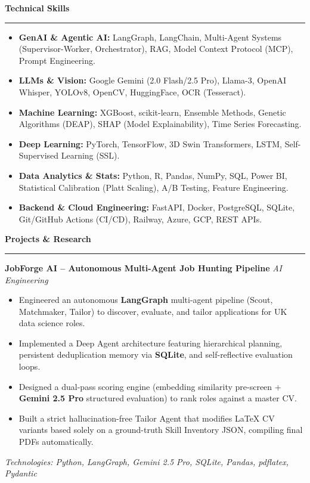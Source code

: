 \documentclass[a4paper,10pt]{article}
\newcommand{\sect}[1]{\vspace{8pt}\noindent\textbf{\color{heading}\large #1}\vspace{3pt}\hrule\vspace{6pt}}
\begin{document}
\sect{Technical Skills}
\begin{itemize}[leftmargin=*, itemsep=0pt, parsep=0pt, topsep=2pt]
    \item \textbf{GenAI \& Agentic AI:} LangGraph, LangChain, Multi-Agent Systems (Supervisor-Worker, Orchestrator), RAG, Model Context Protocol (MCP), Prompt Engineering.
    \item \textbf{LLMs \& Vision:} Google Gemini (2.0 Flash/2.5 Pro), Llama-3, OpenAI Whisper, YOLOv8, OpenCV, HuggingFace, OCR (Tesseract).
    \item \textbf{Machine Learning:} XGBoost, scikit-learn, Ensemble Methods, Genetic Algorithms (DEAP), SHAP (Model Explainability), Time Series Forecasting.
    \item \textbf{Deep Learning:} PyTorch, TensorFlow, 3D Swin Transformers, LSTM, Self-Supervised Learning (SSL).
    \item \textbf{Data Analytics \& Stats:} Python, R, Pandas, NumPy, SQL, Power BI, Statistical Calibration (Platt Scaling), A/B Testing, Feature Engineering.
    \item \textbf{Backend \& Cloud Engineering:} FastAPI, Docker, PostgreSQL, SQLite, Git/GitHub Actions (CI/CD), Railway, Azure, GCP, REST APIs.
\end{itemize}


\sect{Projects \& Research}

\noindent\textbf{JobForge AI – Autonomous Multi-Agent Job Hunting Pipeline} \hfill \textit{AI Engineering}
\begin{itemize}[leftmargin=*, topsep=4pt, itemsep=2pt]
    \item Engineered an autonomous \textbf{LangGraph} multi-agent pipeline (Scout, Matchmaker, Tailor) to discover, evaluate, and tailor applications for UK data science roles.
    \item Implemented a Deep Agent architecture featuring hierarchical planning, persistent deduplication memory via \textbf{SQLite}, and self-reflective evaluation loops.
    \item Designed a dual-pass scoring engine (embedding similarity pre-screen + \textbf{Gemini 2.5 Pro} structured evaluation) to rank roles against a master CV.
    \item Built a strict hallucination-free Tailor Agent that modifies LaTeX CV variants based solely on a ground-truth Skill Inventory JSON, compiling final PDFs automatically.
\end{itemize}
\textit{Technologies: Python, LangGraph, Gemini 2.5 Pro, SQLite, Pandas, pdflatex, Pydantic}
\vspace{8pt}
\end{document}
